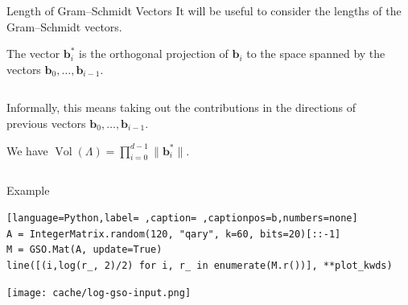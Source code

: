 \documentclass[table,10pt,aspectratio=169]{beamer}
\DeclareMathOperator{\Vol}{Vol}
\renewcommand{\vec}[1]{\ensuremath{\mathbf{#1}}\xspace}
\begin{document}
\begin{frame}[label={sec:orgaf9c032}]{Length of Gram--Schmidt Vectors}
It will be useful to consider the lengths of the Gram--Schmidt vectors.

The vector \(\vec{b}^*_i\) is the orthogonal projection of \(\vec{b}_i\) to the space spanned by the vectors \(\vec{b}_0, \ldots, \vec{b}_{i-1}\).

\begin{columns}
\begin{column}{0.45\columnwidth}
\vspace{1em}

Informally, this means taking out the contributions in the directions of previous vectors  \(\vec{b}_0, \ldots, \vec{b}_{i-1}\).

\vspace{1em}

We have \(\Vol(\Lambda) = \prod_{i=0}^{d-1} \|\vec{b}_{i}^{*}\|\).
\end{column}

\begin{column}{0.45\columnwidth}
\end{column}
\end{columns}
\end{frame}

\begin{frame}[label={sec:org5f5565d},fragile]{Example}
 \begin{lstlisting}[language=Python,label= ,caption= ,captionpos=b,numbers=none]
A = IntegerMatrix.random(120, "qary", k=60, bits=20)[::-1]
M = GSO.Mat(A, update=True)
line([(i,log(r_, 2)/2) for i, r_ in enumerate(M.r())], **plot_kwds)
\end{lstlisting}

\begin{center}
\texttt{[image: cache/log-gso-input.png]}
\end{center}
\end{frame}
\end{document}
